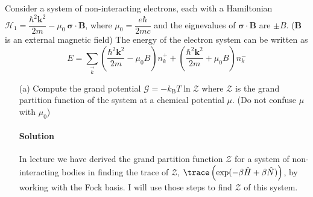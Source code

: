 \documentclass{article}
\begin{document}
	Consider a system of non-interacting electrons, each with a Hamiltonian $ \mathcal{H}_1 = \dfrac{\hbar^2 \bm{k}^2}{2m} - \mu_0 \ \bm{\sigma} \cdot \bm{B} $, where $\mu_0 = \dfrac{e\hbar}{2mc}$ and the eignevalues of $\bm{\sigma} \cdot \bm{B}$ are $\pm B$. ($\bm{B}$ is an external magnetic field) The energy of the electron system can be written as
	\begin{equation}
		E = \sum_{\vec{k}} \left( \frac{\hbar^2 \bm{k}^2}{2m} - \mu_0 B \right) n_k^+ + \left( \frac{\hbar^2 \bm{k}^2}{2m} + \mu_0 B \right) n_k^-
	\end{equation}
	\begin{enumerate}
		\item[(a)] Compute the grand potential $\mathcal{G} = - k_\mathrm{B} T \ln \mathcal{Z} $ where $\mathcal{Z}$ is the grand partition function of the system at a chemical potential $\mu$. (Do not confuse $\mu$ with $\mu_0$)
		\paragraph{Solution} In lecture we have derived the grand partition function $\mathcal{Z}$ for a system of non-interacting bodies in finding the trace of $\mathcal{Z}$, $\trace\left(\exp(-\beta \hat{H} + \beta \hat{N})\right)$, by working with the Fock basis. I will use those steps to find $\mathcal{Z}$ of this system.
		

\end{enumerate}
\end{document}
